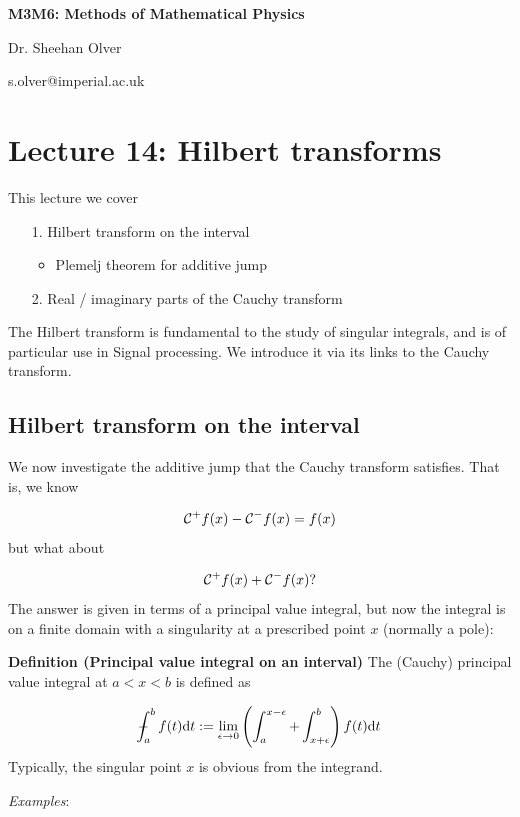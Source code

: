\documentclass[12pt,a4paper]{article}
\def\D{ {\rm d} }
\def\CC{ {\cal C} }
\def\Xint#1{ \mathchoice
   {\XXint\displaystyle\textstyle{#1} }%
   {\XXint\textstyle\scriptstyle{#1} }%
   {\XXint\scriptstyle\scriptscriptstyle{#1} }%
   {\XXint\scriptscriptstyle\scriptscriptstyle{#1} }%
   \!\int}
\def\XXint#1#2#3{ {\setbox0=\hbox{$#1{#2#3}{\int}$}
     \vcenter{\hbox{$#2#3$}}\kern-.5\wd0} }
\def\dashint{\Xint-}
\def\dt{\D t}
\begin{document}
\textbf{M3M6: Methods of Mathematical Physics}

Dr. Sheehan Olver

s.olver@imperial.ac.uk

\section{Lecture 14: Hilbert transforms}
This lecture we cover 

\begin{itemize}
\item[1. ] Hilbert transform on the interval

\begin{itemize}
\item Plemelj theorem for additive jump

\end{itemize}

\item[2. ] Real / imaginary parts of the Cauchy transform

\end{itemize}
The Hilbert transform is fundamental to the study of singular integrals, and is of particular use in Signal processing. We introduce it via its links to the Cauchy transform.

\subsection{Hilbert transform on the interval}
We now investigate the additive jump that the Cauchy transform satisfies. That is, we know

\[
    \CC^+ f(x) - \CC^- f(x) = f(x)
\]
but what about 

\[
    \CC^+ f(x) + \CC^- f(x)?
\]
The answer is given in terms of a principal value integral, but now the integral is on a finite domain with a singularity at a prescribed point $x$ (normally a pole):

\textbf{Definition (Principal value integral on an interval)}  The (Cauchy) principal value integral at $a < x < b$ is defined as

\[
\dashint_a^b f(t) \dt := \lim_{\epsilon \rightarrow 0} \left(\int_a^{x - \epsilon} + \int_{x + \epsilon}^b \right) f(t) \dt
\]
Typically, the singular point $x$ is obvious from the integrand.

\emph{Examples}:
\end{document}
